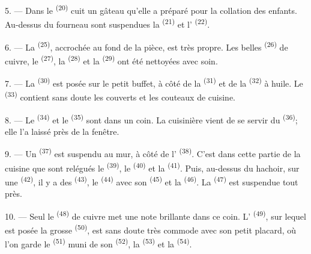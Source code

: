 5. --- Dans le  \textsuperscript{(20)} cuit un gâteau qu'elle a
préparé pour la collation des enfants. Au-dessus du fourneau sont suspendues la
 \textsuperscript{(21)} et l'
\textsuperscript{(22)}.

\VUsaut{4.0mm}
\VUsaut{3.0mm}

6. --- La  \textsuperscript{(25)}, accrochée au
fond de la pièce, est très propre. Les belles 
\textsuperscript{(26)} de cuivre, le 
\textsuperscript{(27)}, la  \textsuperscript{(28)} et la
 \textsuperscript{(29)} ont été nettoyées avec soin.

7. --- La  \textsuperscript{(30)} est posée sur le petit
buffet, à côté de la  \textsuperscript{(31)} et de la
 \textsuperscript{(32)} à huile. Le 
\textsuperscript{(33)} contient sans doute les couverts et les couteaux de
cuisine.

8. --- Le  \textsuperscript{(34)} et le 
\textsuperscript{(35)} sont dans un coin. La cuisinière vient de se servir du
 \textsuperscript{(36)}; elle l'a laissé près de la fenêtre.

9. --- Un  \textsuperscript{(37)} est suspendu au mur, à
côté de l' \textsuperscript{(38)}. C'est dans cette partie de
la cuisine que sont relégués le  \textsuperscript{(39)}, le
 \textsuperscript{(40)} et la 
\textsuperscript{(41)}. Puis, au-dessus du hachoir, sur une 
\textsuperscript{(42)}, il y a des  \textsuperscript{(43)}, le
 \textsuperscript{(44)} avec son 
\textsuperscript{(45)} et la  \textsuperscript{(46)}. La
 \textsuperscript{(47)} est suspendue tout près.

10. --- Seul le  \textsuperscript{(48)} de cuivre met une note
brillante dans ce coin. L' \textsuperscript{(49)}, sur lequel est
posée la grosse  \textsuperscript{(50)}, est sans doute très
commode avec son petit placard, où l'on garde le 
\textsuperscript{(51)} muni de son  \textsuperscript{(52)}, la
 \textsuperscript{(53)} et la 
\textsuperscript{(54)}.

